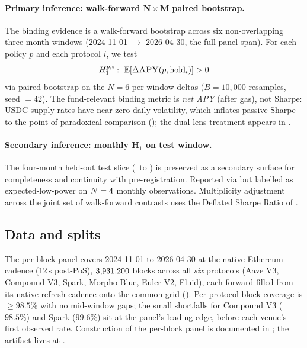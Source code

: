 \paragraph{Primary inference: walk-forward N\,$\times$\,M paired
bootstrap.}  The binding evidence is a walk-forward bootstrap
across six non-overlapping three-month windows
(2024-11-01 $\to$ 2026-04-30, the full panel span).  For each policy
$p$ and each protocol $i$, we test
\begin{equation}
\label{eq:wf-h1}
H_{1}^{p,i}: ~ \mathbb{E}[\Delta\textsc{APY}(p, \text{hold}_{i})] > 0
\end{equation}
via paired bootstrap on the $N = 6$ per-window deltas
($B = 10{,}000$ resamples, seed $= 42$).  The fund-relevant
binding metric is \emph{net APY} (after gas), not Sharpe: USDC
supply rates have near-zero daily volatility, which inflates passive
Sharpe to the point of paradoxical comparison
(\cite[Ch.~4]{lopezdeprado2018}); the dual-lens treatment appears
in .

\paragraph{Secondary inference: monthly H$_1$ on test window.}
The four-month held-out test slice (\DataStart\ to \DataEnd) is
preserved as a secondary surface for completeness and continuity
with pre-registration.  Reported via  but
labelled as expected-low-power on $N=4$ monthly
observations.  Multiplicity adjustment across the joint set of
walk-forward contrasts uses the Deflated Sharpe Ratio of
\cite[Ch.~14.7.3]{lopezdeprado2018}.

\subsection{Data and splits}
\label{sec:emp-data}

The per-block panel covers 2024-11-01 to 2026-04-30 at the native
Ethereum cadence (12\,s post-PoS), $3{,}931{,}200$ blocks across all
\emph{six} protocols (Aave V3, Compound V3, Spark, Morpho Blue,
Euler V2, Fluid), each forward-filled from its native refresh cadence
onto the common grid ().  Per-protocol block
coverage is $\geq 98.5\%$ with no mid-window gaps; the small
shortfalls for Compound V3 ($98.5\%$) and Spark ($99.6\%$) sit at the
panel's leading edge, before each venue's first observed rate.
Construction of the per-block panel is documented in
; the artifact lives at
.

